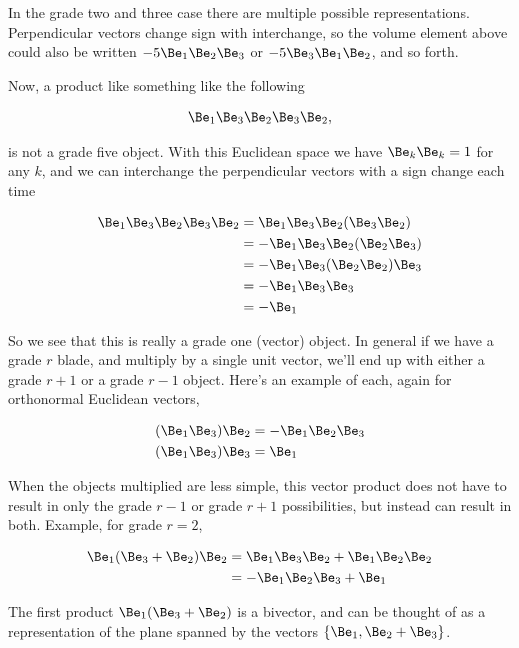 In the grade two and three case there are multiple possible representations.  Perpendicular vectors change sign with interchange, so the volume element above could also be written $-5 \Be_1 \Be_2 \Be_3$ or $-5 \Be_3 \Be_1 \Be_2$, and so forth.

Now, a product like something like the following

\begin{align*}
\Be_1 \Be_3 \Be_2 \Be_3 \Be_2,
\end{align*}

is not a grade five object.  With this Euclidean space we have $\Be_k\Be_k = 1$ for any $k$, and we can interchange the perpendicular vectors with a sign change each time

\begin{align*}
\Be_1 \Be_3 \Be_2 \Be_3 \Be_2
&=
\Be_1 \Be_3 \Be_2 (\Be_3 \Be_2) \\
&=
-\Be_1 \Be_3 \Be_2 (\Be_2 \Be_3) \\
&=
-\Be_1 \Be_3 (\Be_2 \Be_2) \Be_3 \\
&=
-\Be_1 \Be_3 \Be_3 \\
&=
-\Be_1
\end{align*}

So we see that this is really a grade one (vector) object.  In general if we have a grade $r$ blade, and multiply by a single unit vector, we'll end up with either a grade $r+1$ or a grade $r-1$ object.  Here's an example of each, again for orthonormal Euclidean vectors,

\begin{align*}
(\Be_1 \Be_3) \Be_2 &= -\Be_1 \Be_2 \Be_3 \\
(\Be_1 \Be_3) \Be_3 &= \Be_1
\end{align*}

When the objects multiplied are less simple, this vector product does not have to result in only the grade $r-1$ or grade $r+1$ possibilities, but instead can result in both.  Example, for grade $r=2$,

\begin{align*}
\Be_1 (\Be_3 + \Be_2) \Be_2 
&= \Be_1 \Be_3 \Be_2 + \Be_1 \Be_2 \Be_2 \\
&= -\Be_1 \Be_2 \Be_3 + \Be_1 \\
\end{align*}

The first product $\Be_1 (\Be_3 + \Be_2)$ is a bivector, and can be thought of as a representation of the plane spanned by the vectors $\{\Be_1, \Be_2 + \Be_3\}$.

